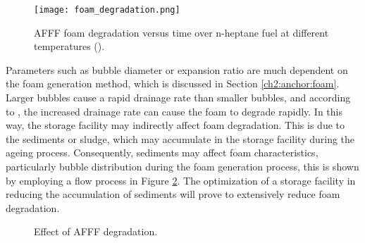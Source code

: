 \begin{figure}[H]
    \centering
    \texttt{[image: foam\_degradation.png]}
    \caption{AFFF foam degradation versus time over n-heptane fuel at different temperatures (\cite{hinnant2017influence}).}
    \label{ch2:figure:degradation}
\end{figure}

Parameters such as bubble diameter or expansion ratio are much dependent on the foam generation method, which is discussed in Section \ref{ch2:anchor:foam}. Larger bubbles cause a rapid drainage rate than smaller bubbles, and according to \cite{hinnant2017influence}, the increased drainage rate can cause the foam to degrade rapidly. In this way, the storage facility may indirectly affect foam degradation. This is due to the sediments or sludge, which may accumulate in the storage facility during the ageing process. Consequently, sediments may affect foam characteristics, particularly bubble distribution during the foam generation process, this is shown by employing a flow process in Figure \ref{ch2:figure:effect}. The optimization of a storage facility in reducing the accumulation of sediments will prove to extensively reduce foam degradation.

\begin{figure}[H]

\centering
\begin{adjustbox}{center}
\end{adjustbox}

\caption{Effect of AFFF degradation.}
\label{ch2:figure:effect}
\end{figure}

